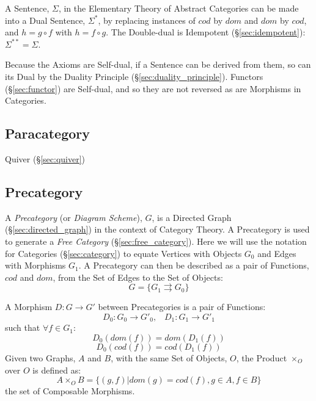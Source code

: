 A Sentence, $\Sigma$, in the Elementary Theory of Abstract Categories
can be made into a Dual Sentence, $\Sigma^*$, by replacing instances
of $cod$ by $dom$ and $dom$ by $cod$, and $h = g \circ f$ with $h = f
\circ g$. The Double-dual is Idempotent (\S\ref{sec:idempotent}):
$\Sigma^{**} = \Sigma$.

Because the Axioms are Self-dual, if a Sentence can be derived from
them, so can its Dual by the Duality Principle
(\S\ref{sec:duality_principle}). Functors (\S\ref{sec:functor}) are
Self-dual, and so they are not reversed as are Morphisms in
Categories.



\subsection{Paracategory}\label{sec:paracategory}

Quiver (\S\ref{sec:quiver})



\subsection{Precategory}\label{sec:precategory}

A \emph{Precategory} (or \emph{Diagram Scheme}), $G$, is a Directed
Graph (\S\ref{sec:directed_graph}) in the context of Category
Theory. A Precategory is used to generate a \emph{Free Category}
(\S\ref{sec:free_category}). Here we will use the notation for
Categories (\S\ref{sec:category}) to equate Vertices with
Objects $G_0$ and Edges with Morphisms $G_1$. A Precategory can then
be described as a pair of Functions, $cod$ and $dom$, from the Set of
Edges to the Set of Objects:
\[
  G = \{G_1 \rightrightarrows G_0\}
\]

A Morphism $D : G \rightarrow G'$ between Precategories is a pair of
Functions:
\[
  D_0 : G_0 \rightarrow G'_0, \;\;\; D_1 : G_1 \rightarrow G'_1
\]
such that $\forall f \in G_1$:
\[
  D_0(dom(f)) = dom(D_1(f))
\]\[
  D_0(cod(f)) = cod(D_1(f))
\]
Given two Graphs, $A$ and $B$, with the same Set of Objects, $O$, the
Product $\times_O$ over $O$ is defined as:
\[
  A \times_O B = \{ (g,f) | dom(g) = cod(f), g \in A, f \in B \}
\]
the set of Composable Morphisms.

